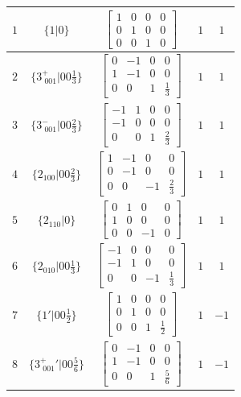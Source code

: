\documentclass[fleqn,8pt]{jsarticle}
\begin{document}
\begin{longtable}{ccccc}
$ 1 $ & $ \{1|0\} $ & $ \begin{bmatrix} 1 & 0 & 0 & 0 \\ 0 & 1 & 0 & 0 \\ 0 & 0 & 1 & 0 \end{bmatrix} $ & $ 1 $ & $ 1 $ \\ \hline
$ 2 $ & $ \{3^{+}_{\,\,001}|0 0 \frac{1}{3}\} $ & $ \begin{bmatrix} 0 & -1 & 0 & 0 \\ 1 & -1 & 0 & 0 \\ 0 & 0 & 1 & \frac{1}{3} \end{bmatrix} $ & $ 1 $ & $ 1 $ \\ \hline
$ 3 $ & $ \{3^{-}_{\,\,001}|0 0 \frac{2}{3}\} $ & $ \begin{bmatrix} -1 & 1 & 0 & 0 \\ -1 & 0 & 0 & 0 \\ 0 & 0 & 1 & \frac{2}{3} \end{bmatrix} $ & $ 1 $ & $ 1 $ \\ \hline
$ 4 $ & $ \{2{}_{100}|0 0 \frac{2}{3}\} $ & $ \begin{bmatrix} 1 & -1 & 0 & 0 \\ 0 & -1 & 0 & 0 \\ 0 & 0 & -1 & \frac{2}{3} \end{bmatrix} $ & $ 1 $ & $ 1 $ \\ \hline
$ 5 $ & $ \{2{}_{110}|0\} $ & $ \begin{bmatrix} 0 & 1 & 0 & 0 \\ 1 & 0 & 0 & 0 \\ 0 & 0 & -1 & 0 \end{bmatrix} $ & $ 1 $ & $ 1 $ \\ \hline
$ 6 $ & $ \{2{}_{010}|0 0 \frac{1}{3}\} $ & $ \begin{bmatrix} -1 & 0 & 0 & 0 \\ -1 & 1 & 0 & 0 \\ 0 & 0 & -1 & \frac{1}{3} \end{bmatrix} $ & $ 1 $ & $ 1 $ \\ \hline
$ 7 $ & $ \{1{}'|0 0 \frac{1}{2}\} $ & $ \begin{bmatrix} 1 & 0 & 0 & 0 \\ 0 & 1 & 0 & 0 \\ 0 & 0 & 1 & \frac{1}{2} \end{bmatrix} $ & $ 1 $ & $ -1 $ \\ \hline
$ 8 $ & $ \{3^{+}_{\,\,001}{}'|0 0 \frac{5}{6}\} $ & $ \begin{bmatrix} 0 & -1 & 0 & 0 \\ 1 & -1 & 0 & 0 \\ 0 & 0 & 1 & \frac{5}{6} \end{bmatrix} $ & $ 1 $ & $ -1 $ \\ \hline

\end{longtable}
\end{document}
